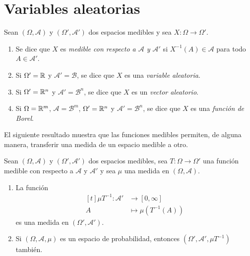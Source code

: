 \documentclass[a4paper, 11pt, extrafontsizes]{memoir}
\begin{document}
\section{Variables aleatorias}

\begin{definition}
    Sean $(\Omega,\mathcal{A})$ y $(\Omega', \mathcal{A}')$ dos espacios medibles y sea $X \colon \Omega \to \Omega'$.
    \begin{enumerate}
        \item Se dice que $X$ es \emph{medible con respecto a $\mathcal{A}$ y $\mathcal{A'}$} si $X^{-1}(A) \in \mathcal{A}$ para todo $A \in \mathcal{A'}$.
        \item Si $\Omega' = \mathbb R$ y $\mathcal{A}' = \mathcal{B}$, se dice que $X$ es una \emph{variable aleatoria}.
        \item Si $\Omega' = \mathbb R^n$ y $\mathcal{A}' = \mathcal{B}^n$, se dice que $X$ es un \emph{vector aleatorio}.
        \item Si $\Omega = \mathbb R^m$, $\mathcal{A} = \mathcal{B}^m$, $\Omega' = \mathbb R^n$ y $\mathcal{A}' = \mathcal{B}^n$, se dice que $X$ es una \emph{función de Borel}.
    \end{enumerate}
\end{definition}

El siguiente resultado muestra que las funciones medibles permiten, de alguna manera, transferir una medida de un espacio medible a otro.

\begin{proposition}\label{pro:1.2.2}
    Sean $(\Omega,\mathcal{A})$ y $(\Omega',\mathcal{A}')$ dos espacios medibles, sea $T \colon \Omega \to \Omega'$ una función medible con respecto a $\mathcal{A}$ y $\mathcal{A}'$ y sea $\mu$ una medida en $(\Omega,\mathcal{A})$.
    \begin{enumerate}
        \item La función
        \[
        \begin{aligned}[t]
            \mu T^{-1} \colon \mathcal{A}' &\longrightarrow [0,\infty] \\
            A &\longmapsto \mu(T^{-1}(A))
        \end{aligned}
        \]
        es una medida en $(\Omega',\mathcal{A}')$.
        \item Si $(\Omega,\mathcal{A},\mu)$ es un espacio de probabilidad, entonces $(\Omega',\mathcal{A}',\mu T^{-1})$ también.
    \end{enumerate}
\end{proposition}
\end{document}
